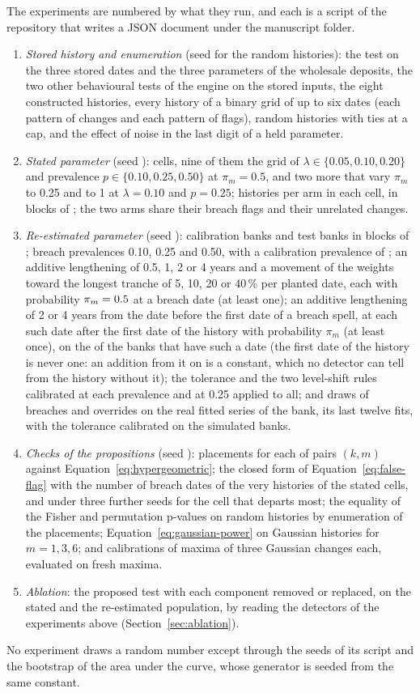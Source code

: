 The experiments are numbered by what they run, and each is a script of the repository that writes a JSON document under the manuscript folder.
\begin{enumerate}
\item \emph{Stored history and enumeration} (seed \seedRepro{} for the random histories): the test on the three stored dates and the three parameters of the wholesale deposits, the two other behavioural tests of the engine on the stored inputs, the eight constructed histories, every history of a binary grid of up to six dates (each pattern of changes and each pattern of flags), \randomN{} random histories with ties at a cap, and the effect of noise in the last digit of a held parameter.
\item \emph{Stated parameter} (seed \seedStated{}): \statedCells{} cells, nine of them the grid of $\lambda\in\{0.05,0.10,0.20\}$ and prevalence $p\in\{0.10,0.25,0.50\}$ at $\pi_m=0.5$, and two more that vary $\pi_m$ to 0.25 and to 1 at $\lambda=0.10$ and $p=0.25$; \statedN{} histories per arm in each cell, in \statedBlocks{} blocks of \statedPerBlock{}; the two arms share their breach flags and their unrelated changes.
\item \emph{Re-estimated parameter} (seed \seedFitted{}): \fitNCal{} calibration banks and \fitN{} test banks in \fitBlocks{} blocks of \fitPerBlock{}; breach prevalences 0.10, 0.25 and 0.50, with a calibration prevalence of \calPrev{}; an additive lengthening of 0.5, 1, 2 or 4 years and a movement of the weights toward the longest tranche of 5, 10, 20 or 40\,\% per planted date, each with probability $\pi_m=0.5{}$ at a breach date (at least one); an additive lengthening of 2 or 4 years from the date before the first date of a breach spell, at each such date after the first date of the history with probability $\pi_m$ (at least once), on the \earlyN{} of the \fitN{} banks that have such a date (the first date of the history is never one: an addition from it on is a constant, which no detector can tell from the history without it); the tolerance and the two level-shift rules calibrated at each prevalence and at 0.25 applied to all; and \realDraws{} draws of breaches and overrides on the real fitted series of the bank, its last twelve fits, with the tolerance calibrated on the simulated banks.
\item \emph{Checks of the propositions} (seed \seedTheory{}): \hyperReps{} placements for each of \hyperCells{} pairs $(k,m)$ against Equation~\eqref{eq:hypergeometric}; the closed form of Equation~\eqref{eq:false-flag} with the number of breach dates of the very histories of the stated cells, and under three further seeds for the cell that departs most; the equality of the Fisher and permutation p-values on \fisherPermN{} random histories by enumeration of the placements; Equation~\eqref{eq:gaussian-power} on \gaussReps{} Gaussian histories for $m=1,3,6$; and \confCalibrations{} calibrations of \confNcal{} maxima of three Gaussian changes each, evaluated on \confNtest{} fresh maxima.
\item \emph{Ablation}: the proposed test with each component removed or replaced, on the stated and the re-estimated population, by reading the detectors of the experiments above (Section~\ref{sec:ablation}).
\end{enumerate}
No experiment draws a random number except through the seeds of its script and the bootstrap of the area under the curve, whose generator is seeded from the same constant.
